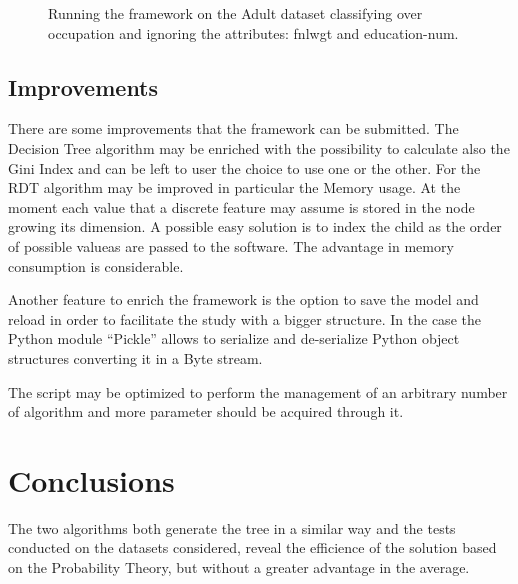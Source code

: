 \documentclass{acm_proc_article-sp-sigmod07}
\begin{document}
\begin{figure}
\label{fig:adult_50}
\centering
{}
\caption{Running the framework on the Adult dataset classifying over
occupation and ignoring the attributes: fnlwgt and education-num.}
\end{figure}

\subsection{Improvements}
There are some improvements that the framework can be submitted.
The Decision Tree algorithm may be enriched with the possibility to
calculate also the Gini Index and can be left to user the choice to use 
one or the other. 
For the RDT algorithm may be improved in particular the Memory usage. At
the moment each value that a discrete feature may assume is stored in the
node growing its dimension. A possible easy solution is to index the child
as the order of possible valueas are passed to the software. The advantage
in memory consumption is considerable.

Another feature to enrich the framework is the option to save the model
and reload in order to facilitate the study with a bigger structure. In
the case the Python module ``Pickle'' allows to serialize and de-serialize
Python object structures converting it in a Byte stream.

The script may be optimized to perform the management of an arbitrary
number of algorithm and more parameter should be acquired through it.

\section{Conclusions}
The two algorithms both generate the tree in a similar way and the tests
conducted on the datasets considered, reveal the efficience of the solution
based on the Probability Theory, but without a greater advantage in the
average. 



\end{document}
